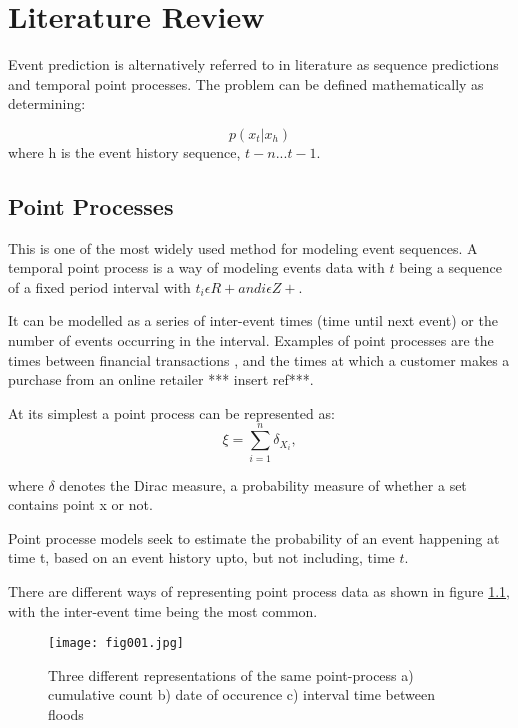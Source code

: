 
\chapter{Literature Review} %

\label{Chapter2} %

Event prediction is alternatively referred to in literature as sequence predictions and temporal point processes. The problem can be defined mathematically as determining:

$$p(x_t | x_h)  $$
where h is the event history sequence, ${t-n ... t-1}$.

\section{Point Processes}

This is one of the most widely used method for modeling event sequences. A temporal point process \parencite{DaleyJones} is a way of modeling events data with $t$ being a sequence of a fixed period interval with $t_i \epsilon R + and i \epsilon Z+$. 

It can be modelled as a series of inter-event times (time until next event) or the number of events occurring in the interval. Examples of point processes are the times between financial transactions \parencite{EngleRusell}, and the times at which a customer makes a purchase from an online retailer *** insert ref***.

At its simplest a point process can be represented as:
$${\xi =\sum _{i=1}^{n}\delta _{X_{i}},}$$

where $\delta$ denotes the Dirac measure, a probability measure of whether a set contains point x or not.

Point processe models seek to estimate the probability of an event happening at time t, based on an event history upto, but not including, time $t$. 

There are different ways of representing point process data as shown in figure \ref{fig:fig1}, with the inter-event time being the most common. 

\begin{figure}[h!]
	\texttt{[image: fig001.jpg]}
	\caption{Three different representations of the same point-process a) cumulative count b) date of occurence c) interval time between floods}
	\label{fig:fig1}
\end{figure}

